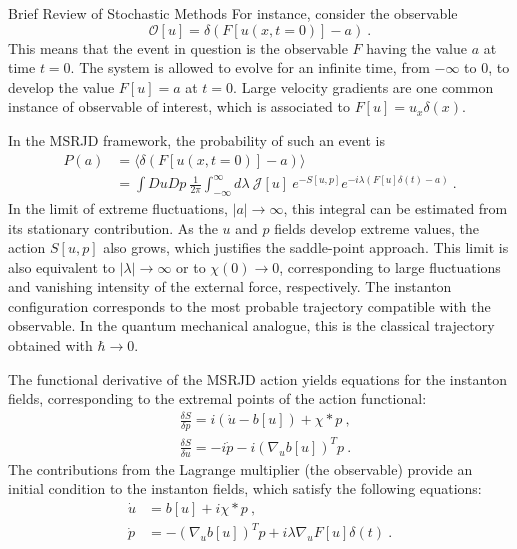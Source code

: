 \begin{chapter}{Brief Review of Stochastic Methods}
For instance, consider the observable
\begin{equation}
    \mathcal{O}[u] = \delta( F[u(x,t=0)] - a ) \ .
\end{equation}
This means that the event in question is the observable $F$ having
the value $a$ at time $t=0$. The system is allowed to evolve for
an infinite time, from $-\infty$ to $0$, to develop the value
$F[u]=a$ at $t=0$.
Large velocity gradients are one common instance of observable of interest, which is associated to $F[u] = u_x \delta(x)$.

In the MSRJD framework, the probability of such an event is
\begin{equation}
\begin{split}
    P(a) &= \langle \delta( F[u(x,t=0)] - a ) \rangle \\
    &= \int D u Dp \ \frac{1}{2\pi} \int_{-\infty}^{\infty}
    d\lambda \ \mathcal{J}[u] \ e^{-S[u,p]} e^{-i \lambda(F[u]\delta(t)-a)} \ .
\end{split}
\end{equation}
In the limit of extreme fluctuations, $|a| \to \infty$, this integral
can be estimated from its stationary contribution.
As the $u$ and $p$ fields develop extreme values, the action $S[u,p]$ also grows,
which justifies the saddle-point approach.
This limit is also equivalent to $|\lambda| \to \infty$ or to $\chi(0) \to 0$,
corresponding to large fluctuations and vanishing intensity of the external
force, respectively.
The instanton configuration corresponds to the most probable
trajectory compatible with the observable.
In the quantum mechanical analogue,
this is the classical trajectory obtained with $\hbar \to 0$.

The functional derivative of the MSRJD action yields equations for
the instanton fields, corresponding to the extremal points of the action
functional:
\begin{align}
    &\frac{\delta S}{\delta p} = i(\dot u -b[u]) + \chi * p  \ , \\
    &\frac{\delta S}{\delta u} = -i \dot{p} - i (\nabla_u b[u])^T p \ .
\end{align}
The contributions from the Lagrange multiplier (the observable) provide
an initial condition to the instanton fields, which satisfy the following equations:
\begin{align}
    \dot u &= b[u] + i \chi * p \ , \\
    \dot{p} &= - (\nabla_u b[u])^T p + i \lambda \nabla_u F[u] \delta(t) \ .
\end{align}


\end{chapter}
